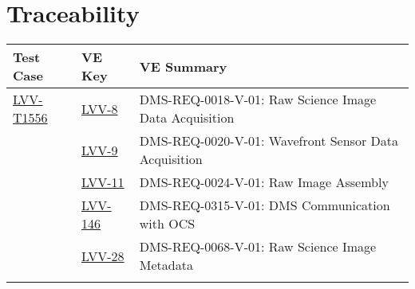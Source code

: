 \section{Traceability}

\begin{longtable}{p{3cm}p{3cm}L{9cm}}
\hline
\textbf{Test Case} & \textbf{VE Key} & \textbf{VE Summary} \\ \hline
\href{https://jira.lsstcorp.org/secure/Tests.jspa#/testCase/LVV-T1556}{LVV-T1556} &
  \href{https://jira.lsstcorp.org/browse/LVV-8}{LVV-8}
  & DMS-REQ-0018-V-01: Raw Science Image Data Acquisition
 \\ 
 &   \href{https://jira.lsstcorp.org/browse/LVV-9}{LVV-9}
  & DMS-REQ-0020-V-01: Wavefront Sensor Data Acquisition
 \\ 
 &   \href{https://jira.lsstcorp.org/browse/LVV-11}{LVV-11}
  & DMS-REQ-0024-V-01: Raw Image Assembly
 \\ 
 &   \href{https://jira.lsstcorp.org/browse/LVV-146}{LVV-146}
  & DMS-REQ-0315-V-01: DMS Communication with OCS
 \\ 
 &   \href{https://jira.lsstcorp.org/browse/LVV-28}{LVV-28}
  & DMS-REQ-0068-V-01: Raw Science Image Metadata
 \\ 
\hline
\end{longtable}
